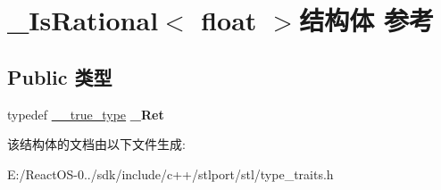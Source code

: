 \hypertarget{struct___is_rational_3_01float_01_4}{}\section{\+\_\+\+Is\+Rational$<$ float $>$结构体 参考}
\label{struct___is_rational_3_01float_01_4}
\subsection*{Public 类型}
\begin{DoxyCompactItemize}
\item 
\mbox{\label{struct___is_rational_3_01float_01_4_a47cbecf030b0a7309da4ac308647be8d}} 
typedef \hyperlink{struct____true__type}{\+\_\+\+\_\+true\+\_\+type} {\bfseries \+\_\+\+Ret}
\end{DoxyCompactItemize}


该结构体的文档由以下文件生成\+:\begin{DoxyCompactItemize}
\item 
E\+:/\+React\+O\+S-\/0../sdk/include/c++/stlport/stl/type\+\_\+traits.\+h\end{DoxyCompactItemize}
